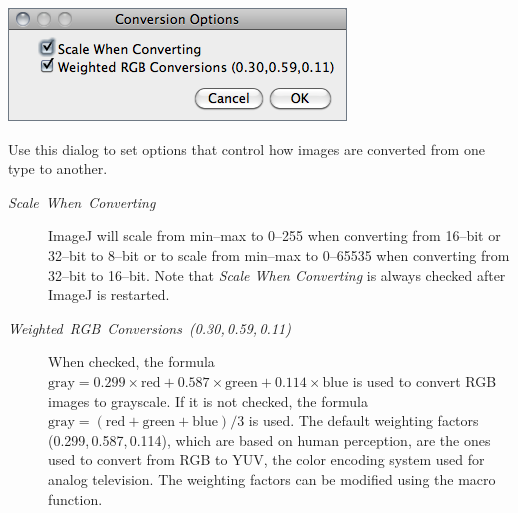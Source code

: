\begin{minipage}[c][1\totalheight][t]{0.47\columnwidth}%
\includegraphics[scale=0.55]{images/Conversions}%
\end{minipage}%
\begin{minipage}[c][1\totalheight][t]{0.53\columnwidth}%
Use this dialog to set options that control how images are converted
from one type to another.%
\end{minipage}
\begin{description}
\item [{\emph{Scale}\ \emph{When}\ \emph{Converting}}] ImageJ will scale
from min--max to 0--255 when converting from 16--bit or 32--bit to
8--bit or to scale from min--max to 0--65535 when converting from
32--bit to 16--bit. Note that \emph{Scale When Converting} is always
checked after ImageJ is restarted.
\item [{\emph{Weighted}\ \emph{RGB}\ \emph{Conversions}\ \emph{(0.30,\,0.59,\,0.11)}}] When
checked, the formula $\text{gray}=0.299\times\text{red}+0.587\times\text{green}+0.114\times\text{blue}$
is used to convert RGB images to grayscale. If it is not checked,
the formula $\text{gray}=(\text{red}+\text{green}+\text{blue})/3$
is used. The default weighting factors (0.299,\,0.587,\,0.114),
which are based on human perception, are the ones used to convert
from RGB to YUV, the color encoding system used for analog television.
The weighting factors can be modified using the 
macro function.
\end{description}



\subsubsection{\protect{}\label{sub:Memory-&-Threads...}}

